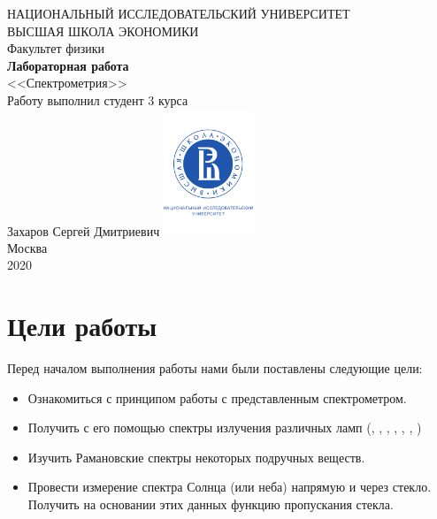 \documentclass[a4paper, 12pt]{article}
\begin{document}
	\begin{titlepage}
		\begin{center}
			$$$$
			$$$$
			$$$$
			$$$$
			{\Large{НАЦИОНАЛЬНЫЙ ИССЛЕДОВАТЕЛЬСКИЙ УНИВЕРСИТЕТ}}\\
			\vspace{0.1cm}
			{\Large{ВЫСШАЯ ШКОЛА ЭКОНОМИКИ}}\\
			\vspace{0.25cm}
			{\large{Факультет физики}}\\
			\vspace{5.5cm}
			{\Huge\textbf{{Лабораторная работа}}}\\%
			\vspace{1cm}
			{\LARGE{<<Спектрометрия>>}}\\%
			\vspace{2cm}
			{Работу выполнил студент 3 курса}\\
			{Захаров Сергей Дмитриевич}
			\vfill
			\includegraphics[width = 0.2\textwidth]{HSElogo}\\
			\vfill
			Москва\\
			2020
		\end{center}
	\end{titlepage}
	
\tableofcontents

\newpage

\section{Цели работы}

Перед началом выполнения работы нами были поставлены следующие цели:

\begin{itemize}
	\item Ознакомиться с принципом работы с представленным спектрометром.
	
	\item Получить с его помощью спектры излучения различных ламп (, , , , , , )
	
	\item Изучить Рамановские спектры некоторых подручных веществ.
	
	\item Провести измерение спектра Солнца (или неба) напрямую и через стекло. Получить на основании этих данных функцию пропускания стекла.
\end{itemize}
\end{document}
